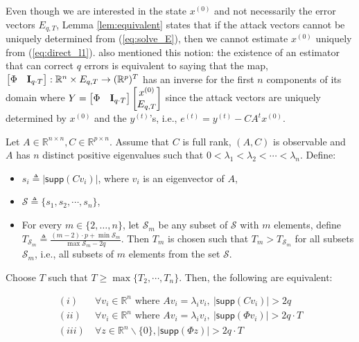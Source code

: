 \documentclass[../../thesis.tex]{subfiles}
\begin{document}
Even though we are interested in the state $x^{(0)}$ and not necessarily the error vectors $E_{q,T}$, Lemma \ref{lem:equivalent} states that if the attack vectors cannot be uniquely determined from (\ref{eq:solve_E}), then we cannot estimate $x^{(0)}$ uniquely from (\ref{eq:direct_l1}). \cite{Fawzi:2014} also mentioned this notion: the existence of an estimator that can correct $q$ errors is equivalent to saying that the map, $\begin{bmatrix} \Phi & {\bf I}_{q\cdot T} \end{bmatrix}: \mathbb{R}^n \times E_{q,T} \rightarrow (\mathbb{R}^p)^T$ has an inverse for the first $n$ components of its domain where $Y = \begin{bmatrix} \Phi & {\bf I}_{q\cdot T} \end{bmatrix} \begin{bmatrix} x^{(0)} \\ E_{q,T} \end{bmatrix} $ since the attack vectors are uniquely determined by $x^{(0)}$ and the $y^{(t)}$'s, i.e., $e^{(t)} = y^{(t)} - CA ^t x^{(0)}$. 

\begin{theorem} Let $A \in \mathbb{R}^{n\times n}, C \in \mathbb{R}^{p\times n}$. Assume that $C$ is full rank, $(A,C)$ is observable and $A$ has $n$ distinct positive eigenvalues such that $0 < \lambda_1 < \lambda_2 < \cdots < \lambda_n$. 
Define:
\begin{itemize}
\item
$s_i \triangleq \lvert \textsf{supp} (Cv_i) \vert$, where $v_i$ is an eigenvector of $A$, 
\item
$\mathcal{S} \triangleq \{ s_1, s_2, \cdots, s_n \}$,
\item
For every $m \in \{2, \ldots, n\}$, let $\mathcal{S}_m$ be any subset of $\mathcal{S}$ with $m$ elements, define $T_{\mathcal{S}_m} \triangleq \frac {  (m-2) \cdot p + \min \mathcal{S}_m } {\max \mathcal{S}_m - 2q }$.
Then $T_m$ is chosen such that $T_m > T_{\mathcal{S}_m}$ for all subsets $\mathcal{S}_m$, i.e., all subsets of $m$ elements from the set $\mathcal{S}$.
\end{itemize}

Choose $T$ such that  $T \ge \max \{ T_2, \cdots, T_n \}$.
Then, the following are equivalent:

\begin{equation}
\begin{aligned} 
 (i)  &~\forall v_i \in \mathbb{R}^n \text{ where } Av_i =\lambda_i v_i, ~ \lvert \textsf{supp}(Cv_i) \rvert > 2q  \\
  (ii)  &~\forall v_i \in \mathbb{R}^n \text{ where } Av_i =\lambda_i v_i,  ~\lvert \textsf{supp} (\Phi v_i) \rvert > 2q \cdot T  \\
  (iii) &~  \forall z \in \mathbb{R}^n\backslash \{0 \}, \lvert \textsf{supp} (\Phi z) \rvert > 2 q \cdot T  \nonumber %
\label{eq:new_condition}
\end{aligned}
\end{equation}
\end{theorem}
\end{document}
